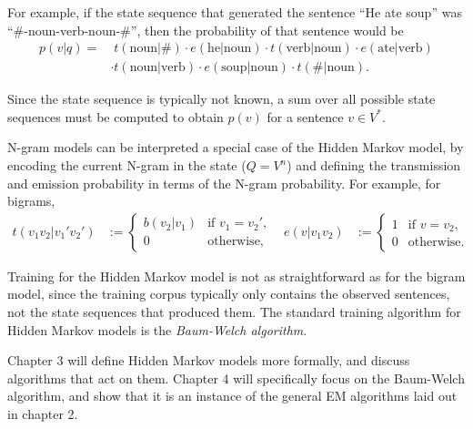 For example, if the state sequence that generated the sentence ``He ate soup''
was ``\#-noun-verb-noun-\#'', then the probability of that sentence would be
\begin{align*}
 p(v|q)
  =&\; t(\text{noun}|\#) \cdot e(\text{he}|\text{noun}) \cdot t(\text{verb}|\text{noun}) \cdot e(\text{ate}|\text{verb}) \\
  &\cdot t(\text{noun}|\text{verb}) \cdot e(\text{soup}|\text{noun}) \cdot t(\#|\text{noun}).
\end{align*}

Since the state sequence is typically not known, a sum over all possible state
sequences must be computed to obtain $p(v)$ for a sentence $v\in V^*$.

N-gram models can be interpreted a special case of the Hidden Markov model, by
encoding the current N-gram in the state ($Q = V^n$) and defining the
transmission and emission probability in terms of the N-gram probability. For
example, for bigrams,
\begin{align*}
 t(v_1v_2|v_1'v_2') &:= \begin{cases}
  b(v_2|v_1) & \text{if } v_1 = v_2', \\
  0 &\text{otherwise},
 \end{cases} &
 e(v|v_1v_2) &:= \begin{cases}
  1 & \text{if } v = v_2, \\
  0 &\text{otherwise}.
 \end{cases}
\end{align*}

Training for the Hidden Markov model is not as straightforward as for the
bigram model, since the training corpus typically only contains the observed
sentences, not the state sequences that produced them. The standard training
algorithm for Hidden Markov models is the \emph{Baum-Welch algorithm}.
\cite{baupetsouwei70,baum1972}

Chapter 3 will define Hidden Markov models more formally, and discuss
algorithms that act on them. Chapter 4 will specifically focus on the
Baum-Welch algorithm, and show that it is an instance of the general EM
algorithms laid out in chapter 2.
